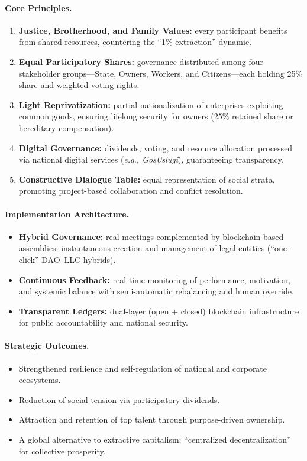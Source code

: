 \documentclass[11pt,a4paper]{article}
\theoremstyle{definition}
\theoremstyle{remark}
\begin{document}
\paragraph{Core Principles.}
\begin{enumerate}[noitemsep,topsep=0pt]
    \item \textbf{Justice, Brotherhood, and Family Values:} every participant benefits from shared resources, countering the ``1\% extraction'' dynamic.
    \item \textbf{Equal Participatory Shares:} governance distributed among four stakeholder groups---State, Owners, Workers, and Citizens---each holding 25\% share and weighted voting rights.
    \item \textbf{Light Reprivatization:} partial nationalization of enterprises exploiting common goods, ensuring lifelong security for owners (25\% retained share or hereditary compensation).
    \item \textbf{Digital Governance:} dividends, voting, and resource allocation processed via national digital services (\textit{e.g., GosUslugi}), guaranteeing transparency.
    \item \textbf{Constructive Dialogue Table:} equal representation of social strata, promoting project-based collaboration and conflict resolution.
\end{enumerate}

\paragraph{Implementation Architecture.}
\begin{itemize}[noitemsep,topsep=0pt]
    \item \textbf{Hybrid Governance:} real meetings complemented by blockchain-based assemblies; instantaneous creation and management of legal entities (“one-click” DAO–LLC hybrids).
    \item \textbf{Continuous Feedback:} real-time monitoring of performance, motivation, and systemic balance with semi-automatic rebalancing and human override.
    \item \textbf{Transparent Ledgers:} dual-layer (open + closed) blockchain infrastructure for public accountability and national security.
\end{itemize}

\paragraph{Strategic Outcomes.}
\begin{itemize}[noitemsep,topsep=0pt]
    \item Strengthened resilience and self-regulation of national and corporate ecosystems.
    \item Reduction of social tension via participatory dividends.
    \item Attraction and retention of top talent through purpose-driven ownership.
    \item A global alternative to extractive capitalism: “centralized decentralization” for collective prosperity.
\end{itemize}
\end{document}
